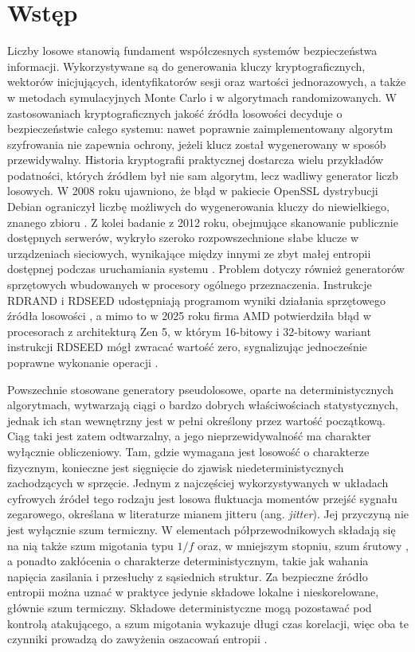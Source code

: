 \chapter{Wstęp}

Liczby losowe stanowią fundament współczesnych systemów bezpieczeństwa informacji.
Wykorzystywane są do generowania kluczy kryptograficznych, wektorów inicjujących,
identyfikatorów sesji oraz wartości jednorazowych, a także w metodach symulacyjnych
Monte Carlo i w algorytmach randomizowanych. W zastosowaniach kryptograficznych jakość
źródła losowości decyduje o bezpieczeństwie całego systemu: nawet poprawnie
zaimplementowany algorytm szyfrowania nie zapewnia ochrony, jeżeli klucz został
wygenerowany w sposób przewidywalny. Historia kryptografii praktycznej dostarcza wielu
przykładów podatności, których źródłem był nie sam algorytm, lecz wadliwy generator
liczb losowych. W 2008 roku ujawniono, że błąd w pakiecie OpenSSL dystrybucji Debian
ograniczył liczbę możliwych do wygenerowania kluczy do niewielkiego, znanego zbioru
\cite{yilek2009debian}. Z kolei badanie z 2012 roku, obejmujące skanowanie publicznie
dostępnych serwerów, wykryło szeroko rozpowszechnione słabe klucze w urządzeniach
sieciowych, wynikające między innymi ze zbyt małej entropii dostępnej podczas
uruchamiania systemu \cite{heninger2012mining}. Problem dotyczy również generatorów
sprzętowych wbudowanych w procesory ogólnego przeznaczenia. Instrukcje RDRAND i RDSEED
udostępniają programom wyniki działania sprzętowego źródła losowości
\cite{mechalas2018drng}, a mimo to w 2025 roku firma AMD potwierdziła błąd
w procesorach z architekturą Zen 5, w którym 16-bitowy i 32-bitowy wariant instrukcji
RDSEED mógł zwracać wartość zero, sygnalizując jednocześnie poprawne wykonanie operacji
\cite{amd2025sb7055}.

Powszechnie stosowane generatory pseudolosowe, oparte na deterministycznych algorytmach,
wytwarzają ciągi o bardzo dobrych właściwościach statystycznych, jednak ich stan
wewnętrzny jest w pełni określony przez wartość początkową. Ciąg taki jest zatem
odtwarzalny, a jego nieprzewidywalność ma charakter wyłącznie obliczeniowy. Tam, gdzie
wymagana jest losowość o charakterze fizycznym, konieczne jest sięgnięcie do zjawisk
niedeterministycznych zachodzących w sprzęcie. Jednym z najczęściej wykorzystywanych
w układach cyfrowych źródeł tego rodzaju jest losowa fluktuacja momentów przejść sygnału
zegarowego, określana w literaturze mianem jitteru (ang. \emph{jitter}). Jej przyczyną
nie jest wyłącznie szum termiczny. W elementach półprzewodnikowych składają się na nią
także szum migotania typu $1/f$ oraz, w mniejszym stopniu, szum śrutowy
\cite{hajimiri1999jitter}, a ponadto zakłócenia o charakterze deterministycznym, takie
jak wahania napięcia zasilania i przesłuchy z sąsiednich struktur. Za bezpieczne źródło
entropii można uznać w praktyce jedynie składowe lokalne i nieskorelowane, głównie szum
termiczny. Składowe deterministyczne mogą pozostawać pod kontrolą atakującego, a szum
migotania wykazuje długi czas korelacji, więc oba te czynniki prowadzą do zawyżenia
oszacowań entropii \cite{baudet2011security}.

